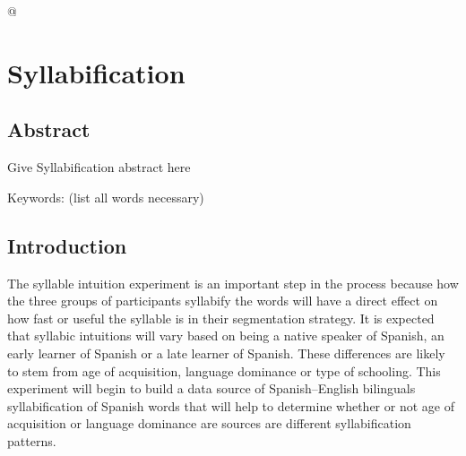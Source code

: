 \documentclass[
12pt, %
english, %
doublespacing, %
nolistspacing, %
liststotoc, %
headsepline, %
chapterinoneline, %
openany, %
]{DoctoralThesis}\usepackage[]{graphicx}\usepackage[]{color}
\begin{document}




@

\chapter{Syllabification} %

\label{Chapter2} %


\section{Abstract}

Give Syllabification abstract here

Keywords: (list all words necessary)


\section{Introduction}


The syllable intuition experiment is an important step in the process because how the three groups of participants syllabify the words will have a direct effect on how fast or useful the syllable is in their segmentation strategy. It is expected that syllabic intuitions will vary based on being a native speaker of Spanish, an early learner of Spanish or a late learner of Spanish. These differences are likely to stem from age of acquisition, language dominance or type of schooling. This experiment will begin to build a data source of Spanish–English bilinguals syllabification of Spanish words that will help to determine whether or not age of acquisition or language dominance are sources are different syllabification patterns. 
\end{document}
